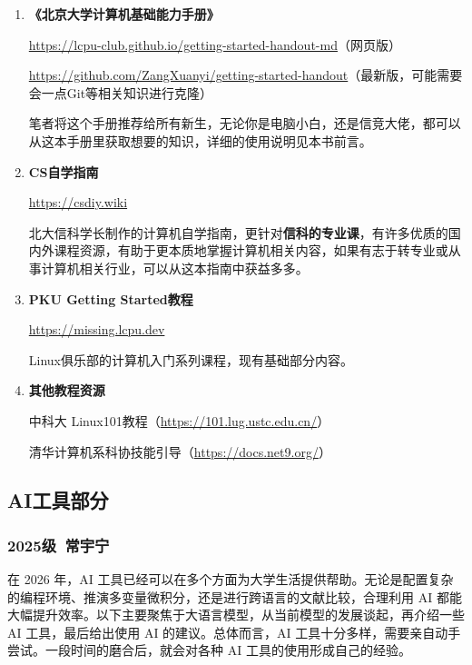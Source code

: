 \begin{enumerate}
    \item \textbf{《北京大学计算机基础能力手册》}

    \url{https://lcpu-club.github.io/getting-started-handout-md}（网页版）

    \url{https://github.com/ZangXuanyi/getting-started-handout}（最新版，可能需要会一点Git等相关知识进行克隆）

    笔者将这个手册推荐给所有新生，无论你是电脑小白，还是信竞大佬，都可以从这本手册里获取想要的知识，详细的使用说明见本书前言。

    \item \textbf{CS自学指南}

    \url{https://csdiy.wiki}

    北大信科学长制作的计算机自学指南，更针对\textbf{信科的专业课}，有许多优质的国内外课程资源，有助于更本质地掌握计算机相关内容，如果有志于转专业或从事计算机相关行业，可以从这本指南中获益多多。

    \item \textbf{PKU Getting Started教程}

    \url{https://missing.lcpu.dev}

    Linux俱乐部的计算机入门系列课程，现有基础部分内容。

    \item \textbf{其他教程资源}

    中科大 Linux101教程（\url{https://101.lug.ustc.edu.cn/}）

    清华计算机系科协技能引导（\url{https://docs.net9.org/}）
\end{enumerate}

\subsection{AI工具部分}

\subsubsection{2025级\ 常宇宁}

在 2026 年，AI 工具已经可以在多个方面为大学生活提供帮助。无论是配置复杂的编程环境、推演多变量微积分，还是进行跨语言的文献比较，合理利用 AI 都能大幅提升效率。以下主要聚焦于大语言模型，从当前模型的发展谈起，再介绍一些 AI 工具，最后给出使用 AI 的建议。总体而言，AI 工具十分多样，需要亲自动手尝试。一段时间的磨合后，就会对各种 AI 工具的使用形成自己的经验。

\vspace{10pt}

